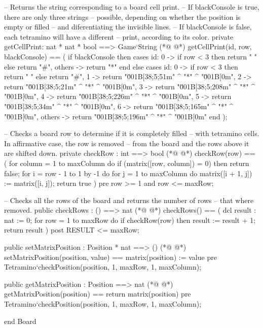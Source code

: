 \begin{vdmpp}[breaklines=true]
  -- Returns the string corresponding to a board cell print.
  -- If blackConsole is true, there are only three strings
  -- possible, depending on whether the position is empty or filled
  -- and diferentiating the invisible lines.
  -- If blackConsole is false, each tetramino will have a different
  -- print, according to its color.
  private getCellPrint: nat * nat * bool ==> Game`String
(*@
\label{getCellPrint:83}
@*)
  getCellPrint(id, row, blackConsole) == (
   if blackConsole then
    cases id:
     0 -> if row < 3 then return " " else return "#",
     others -> return "*"
    end
   else
    cases id:
     0 -> if row < 3 then return " " else return "#",
     1 -> return "\u001B[38;5;51m" ^ "*" ^ "\u001B[0m",
     2 -> return "\u001B[38;5;21m" ^ "*" ^ "\u001B[0m",
     3 -> return "\u001B[38;5;208m" ^ "*" ^ "\u001B[0m",
     4 -> return "\u001B[38;5;226m" ^ "*" ^ "\u001B[0m",
     5 -> return "\u001B[38;5;34m" ^ "*" ^ "\u001B[0m",
     6 -> return "\u001B[38;5;165m" ^ "*" ^ "\u001B[0m",
     others -> return "\u001B[38;5;196m" ^ "*" ^ "\u001B[0m"    
    end
  );
  
  -- Checks a board row to determine if it is completely filled
  -- with tetramino cells. In affirmative case, the row is removed
  -- from the board and the rows above it are shifted down.
  private checkRow : int ==> bool
(*@
\label{checkRow:106}
@*)
  checkRow(row) == (
   for column = 1 to maxColumn do
    if (matrix([row, column]) = 0) then return false;
   for i = row - 1 to 1 by -1 do
    for j = 1 to maxColumn do
     matrix([i + 1, j]) := matrix([i, j]);
   return true
  )
  pre row >= 1 and row <= maxRow;
  
  -- Checks all the rows of the board and returns the number of rows
  -- that where removed.
  public checkRows : () ==> nat
(*@
\label{checkRows:119}
@*)
  checkRows() == (
   dcl result : nat := 0;
   for row = 1 to maxRow do
    if checkRow(row) then result := result + 1;
   return result
  )
  post RESULT <= maxRow;
  
  public setMatrixPosition : Position * nat ==> ()
(*@
\label{setMatrixPosition:128}
@*)
  setMatrixPosition(position, value) ==
   matrix(position) := value
  pre Tetramino`checkPosition(position, 1, maxRow, 1, maxColumn);
  
  public getMatrixPosition : Position ==> nat
(*@
\label{getMatrixPosition:133}
@*)
  getMatrixPosition(position) ==
   return matrix(position)  
  pre Tetramino`checkPosition(position, 1, maxRow, 1, maxColumn);
 
end Board
\end{vdmpp}
